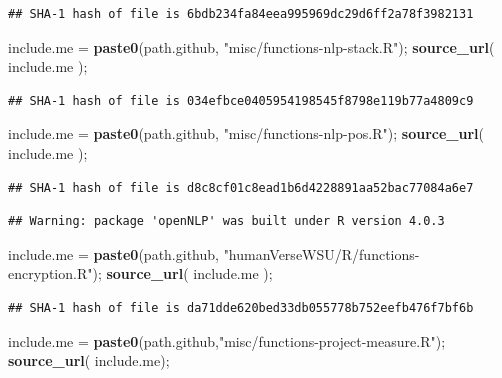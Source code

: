 \documentclass[]{article}
\newenvironment{Shaded}{\begin{snugshade}}{\end{snugshade}}
\newcommand{\KeywordTok}[1]{\textcolor[rgb]{0.13,0.29,0.53}{\textbf{#1}}}
\newcommand{\NormalTok}[1]{#1}
\newcommand{\StringTok}[1]{\textcolor[rgb]{0.31,0.60,0.02}{#1}}
\begin{document}
\begin{verbatim}
## SHA-1 hash of file is 6bdb234fa84eea995969dc29d6ff2a78f3982131
\end{verbatim}

\begin{Shaded}
\begin{Highlighting}[]
\NormalTok{include.me =}\StringTok{ }\KeywordTok{paste0}\NormalTok{(path.github, }\StringTok{"misc/functions{-}nlp{-}stack.R"}\NormalTok{);}
\KeywordTok{source\_url}\NormalTok{( include.me );}
\end{Highlighting}
\end{Shaded}

\begin{verbatim}
## SHA-1 hash of file is 034efbce0405954198545f8798e119b77a4809c9
\end{verbatim}

\begin{Shaded}
\begin{Highlighting}[]
\NormalTok{include.me =}\StringTok{ }\KeywordTok{paste0}\NormalTok{(path.github, }\StringTok{"misc/functions{-}nlp{-}pos.R"}\NormalTok{);}
\KeywordTok{source\_url}\NormalTok{( include.me );}
\end{Highlighting}
\end{Shaded}

\begin{verbatim}
## SHA-1 hash of file is d8c8cf01c8ead1b6d4228891aa52bac77084a6e7
\end{verbatim}

\begin{verbatim}
## Warning: package 'openNLP' was built under R version 4.0.3
\end{verbatim}

\begin{Shaded}
\begin{Highlighting}[]
\NormalTok{include.me =}\StringTok{ }\KeywordTok{paste0}\NormalTok{(path.github, }\StringTok{"humanVerseWSU/R/functions{-}encryption.R"}\NormalTok{);}
\KeywordTok{source\_url}\NormalTok{( include.me );}
\end{Highlighting}
\end{Shaded}

\begin{verbatim}
## SHA-1 hash of file is da71dde620bed33db055778b752eefb476f7bf6b
\end{verbatim}

\begin{Shaded}
\begin{Highlighting}[]
\NormalTok{include.me =}\StringTok{ }\KeywordTok{paste0}\NormalTok{(path.github,}\StringTok{"misc/functions{-}project{-}measure.R"}\NormalTok{);}
\KeywordTok{source\_url}\NormalTok{( include.me);}
\end{Highlighting}
\end{Shaded}
\end{document}
